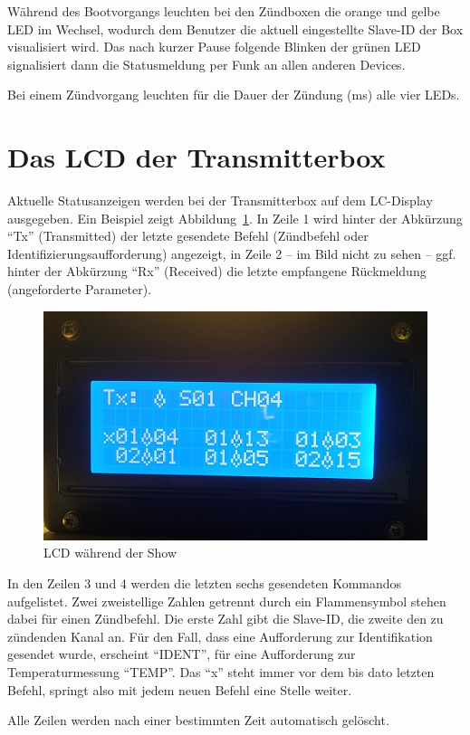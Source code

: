 \documentclass[pdftex, parskip, numbers=noenddot, toc=listof]{scrbook}
\begin{document}
	Während des Bootvorgangs leuchten bei den Zündboxen die orange und gelbe LED im Wechsel, wodurch dem Benutzer die aktuell eingestellte Slave-ID der Box visualisiert wird. Das nach kurzer Pause folgende Blinken der grünen LED signalisiert dann die Statusmeldung per Funk an allen anderen Devices.

	Bei einem Zündvorgang leuchten für die Dauer der Zündung (\unit[11]{ms}) alle vier LEDs.

	\section{Das LCD der Transmitterbox}

	Aktuelle Statusanzeigen werden bei der Transmitterbox auf dem LC-Display ausgegeben. Ein Beispiel zeigt Abbildung~\ref{fig:senderanzeige}. In Zeile 1 wird hinter der Abkürzung \enquote{Tx} (Transmitted) der letzte gesendete Befehl (Zündbefehl oder Identifizierungsaufforderung) angezeigt, in Zeile 2 -- im Bild nicht zu sehen -- ggf. hinter der Abkürzung \enquote{Rx} (Received) die letzte empfangene Rückmeldung (angeforderte Parameter).

	\begin{figure}
		\centering
		\includegraphics[width=.7\textwidth]{Bilder/SenderAnzeige}
		\caption{LCD während der Show}
		\label{fig:senderanzeige}
	\end{figure}

	In den Zeilen 3 und 4 werden die letzten sechs gesendeten Kommandos aufgelistet. Zwei zweistellige Zahlen getrennt durch ein Flammensymbol stehen dabei für einen Zündbefehl. Die erste Zahl gibt die Slave-ID, die zweite den zu zündenden Kanal an. Für den Fall, dass eine Aufforderung zur Identifikation gesendet wurde, erscheint \enquote{IDENT}, für eine Aufforderung zur Temperaturmessung \enquote{TEMP}. Das \enquote{x} steht immer vor dem bis dato letzten Befehl, springt also mit jedem neuen Befehl eine Stelle weiter.

	Alle Zeilen werden nach einer bestimmten Zeit automatisch gelöscht.
\end{document}
